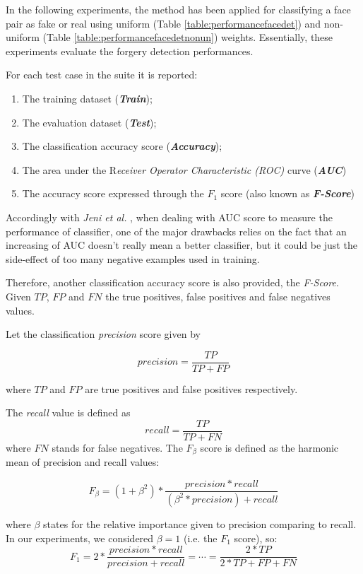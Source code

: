 In the following experiments, the  method has been applied for classifying a face pair as fake or real using uniform (Table \ref{table:performancefacedet}) and non-uniform (Table \ref{table:performancefacedetnonun}) weights. Essentially, these experiments evaluate the forgery detection performances.

For each test case in the suite it is reported:
\begin{enumerate}
\item The training dataset (\textbf{\emph{Train}});
\item The evaluation dataset (\textbf{\emph{Test}});
\item The classification accuracy score (\textbf{\emph{Accuracy}});
\item The area under the R\emph{eceiver Operator Characteristic (ROC)} curve (\textbf{\emph{AUC}})
\item The accuracy score expressed through the $F_1$ score (also known as \textbf{\emph{F-Score}})
\end{enumerate}

Accordingly with \emph{Jeni et al.} \cite{jeni2013facing}, when dealing with AUC score to measure the performance of classifier, one of the major drawbacks relies on the fact that an increasing of AUC doesn't really mean a better classifier, but it could be just the side-effect of too many negative examples used in training.

Therefore, another classification accuracy score is also provided, the \emph{F-Score}. Given $TP$, $FP$ and $FN$ the true positives, false positives and false negatives values. 

Let the classification \emph{precision} score given by

$$
precision = \frac{TP}{TP + FP}
$$

where $TP$ and $FP$ are true positives and false positives respectively.

The \emph{recall} value is defined as
$$
recall = \frac{TP}{TP + FN}
$$
where $FN$ stands for false negatives. The $F_{\beta}$ score is defined as the harmonic mean of precision and recall values:

\begin{equation}
F_{\beta} = (1 + \beta^2) * \frac{precision * recall}{(\beta^2 * precision) + recall}
\end{equation}

where $\beta$ states for the relative importance given to precision comparing to recall. In our experiments, we considered $\beta = 1$ (i.e. the $F_1$ score), so:
\begin{equation}
F_{1} = 2 * \frac{precision * recall}{precision + recall}  = \cdots = \frac{2 * TP}{2 * TP + FP + FN}
\end{equation}

